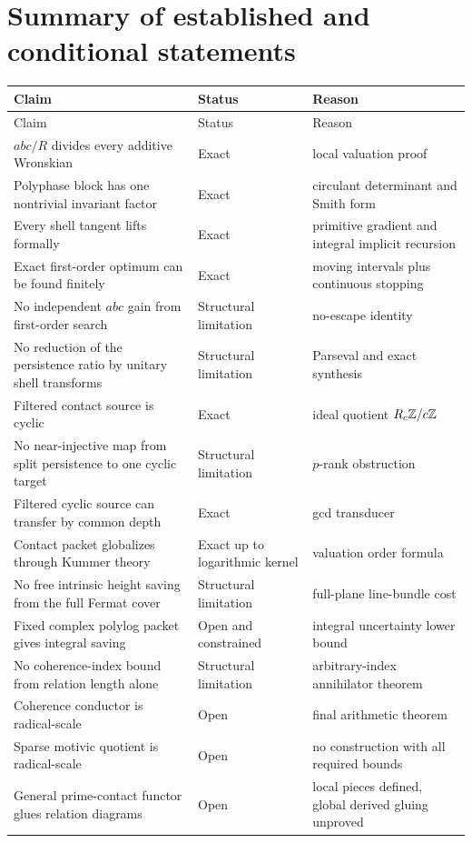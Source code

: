 \section{Summary of established and conditional statements}
\begingroup\footnotesize\setlength{\tabcolsep}{3pt}
\begin{longtable}{L{0.31\textwidth}L{0.15\textwidth}L{0.43\textwidth}}
\toprule
Claim & Status & Reason\\
\midrule
\endfirsthead
\toprule
Claim & Status & Reason\\
\midrule
\endhead
$abc/R$ divides every additive Wronskian & Exact & local valuation proof\\
Polyphase block has one nontrivial invariant factor & Exact & circulant determinant and Smith form\\
Every shell tangent lifts formally & Exact & primitive gradient and integral implicit recursion\\
Exact first-order optimum can be found finitely & Exact & moving intervals plus continuous stopping\\
No independent $abc$ gain from first-order search & Structural limitation & no-escape identity\\
No reduction of the persistence ratio by unitary shell transforms & Structural limitation & Parseval and exact synthesis\\
Filtered contact source is cyclic & Exact & ideal quotient $R_c\mathbb Z/c\mathbb Z$\\
No near-injective map from split persistence to one cyclic target & Structural limitation & $p$-rank obstruction\\
Filtered cyclic source can transfer by common depth & Exact & gcd transducer\\
Contact packet globalizes through Kummer theory & Exact up to logarithmic kernel & valuation order formula\\
No free intrinsic height saving from the full Fermat cover & Structural limitation & full-plane line-bundle cost\\
Fixed complex polylog packet gives integral saving & Open and constrained & integral uncertainty lower bound\\
No coherence-index bound from relation length alone & Structural limitation & arbitrary-index annihilator theorem\\
Coherence conductor is radical-scale & Open & final arithmetic theorem\\
Sparse motivic quotient is radical-scale & Open & no construction with all required bounds\\
General prime-contact functor glues relation diagrams & Open & local pieces defined, global derived gluing unproved\\
\bottomrule
\end{longtable}
\endgroup

